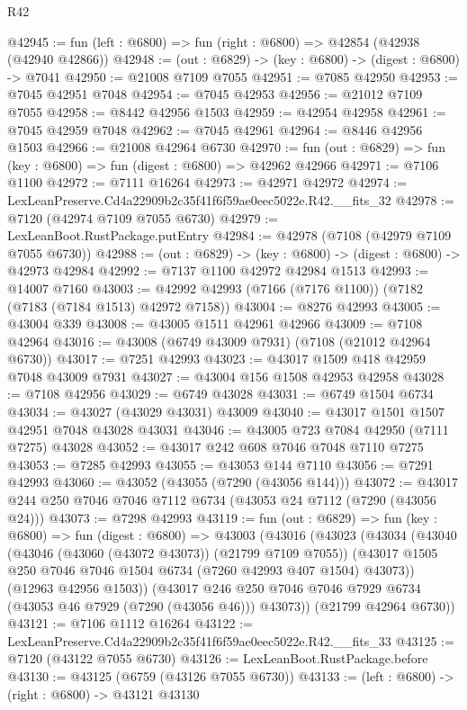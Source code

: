 \begin{lexlean}{R42}
\begin{coremodule}
{@42945 := fun (left : @6800) => fun (right : @6800) => @42854 (@42938 (@42940 @42866))
@42948 := (out : @6829) -> (key : @6800) -> (digest : @6800) -> @7041
@42950 := @21008 @7109 @7055
@42951 := @7085 @42950
@42953 := @7045 @42951 @7048
@42954 := @7045 @42953
@42956 := @21012 @7109 @7055
@42958 := @8442 @42956 @1503
@42959 := @42954 @42958
@42961 := @7045 @42959 @7048
@42962 := @7045 @42961
@42964 := @8446 @42956 @1503
@42966 := @21008 @42964 @6730
@42970 := fun (out : @6829) => fun (key : @6800) => fun (digest : @6800) => @42962 @42966
@42971 := @7106 @1100
@42972 := @7111 @16264
@42973 := @42971 @42972
@42974 := LexLeanPreserve.Cd4a22909b2c35f41f6f59ae0eec5022e.R42.__fits_32
@42978 := @7120 (@42974 @7109 @7055 @6730)
@42979 := LexLeanBoot.RustPackage.putEntry
@42984 := @42978 (@7108 (@42979 @7109 @7055 @6730))
@42988 := (out : @6829) -> (key : @6800) -> (digest : @6800) -> @42973 @42984
@42992 := @7137 @1100 @42972 @42984 @1513
@42993 := @14007 @7160
@43003 := @42992 @42993 (@7166 (@7176 @1100)) (@7182 (@7183 (@7184 @1513) @42972 @7158))
@43004 := @8276 @42993
@43005 := @43004 @339
@43008 := @43005 @1511 @42961 @42966
@43009 := @7108 @42964
@43016 := @43008 (@6749 @43009 @7931) (@7108 (@21012 @42964 @6730))
@43017 := @7251 @42993
@43023 := @43017 @1509 @418 @42959 @7048 @43009 @7931
@43027 := @43004 @156 @1508 @42953 @42958
@43028 := @7108 @42956
@43029 := @6749 @43028
@43031 := @6749 @1504 @6734
@43034 := @43027 (@43029 @43031) @43009
@43040 := @43017 @1501 @1507 @42951 @7048 @43028 @43031
@43046 := @43005 @723 @7084 @42950 (@7111 @7275) @43028
@43052 := @43017 @242 @608 @7046 @7048 @7110 @7275
@43053 := @7285 @42993
@43055 := @43053 @144 @7110
@43056 := @7291 @42993
@43060 := @43052 (@43055 (@7290 (@43056 @144)))
@43072 := @43017 @244 @250 @7046 @7046 @7112 @6734 (@43053 @24 @7112 (@7290 (@43056 @24)))
@43073 := @7298 @42993
@43119 := fun (out : @6829) =>
  fun (key : @6800) =>
  fun (digest : @6800) =>
  @43003
    (@43016
      (@43023
        (@43034
          (@43040
            (@43046 (@43060 (@43072 @43073)) (@21799 @7109 @7055))
            (@43017 @1505 @250 @7046 @7046 @1504 @6734 (@7260 @42993 @407 @1504) @43073))
          (@12963 @42956 @1503))
        (@43017 @246 @250 @7046 @7046 @7929 @6734 (@43053 @46 @7929 (@7290 (@43056 @46))) @43073))
      (@21799 @42964 @6730))
@43121 := @7106 @1112 @16264
@43122 := LexLeanPreserve.Cd4a22909b2c35f41f6f59ae0eec5022e.R42.__fits_33
@43125 := @7120 (@43122 @7055 @6730)
@43126 := LexLeanBoot.RustPackage.before
@43130 := @43125 (@6759 (@43126 @7055 @6730))
@43133 := (left : @6800) -> (right : @6800) -> @43121 @43130
}
\end{coremodule}
\end{lexlean}
